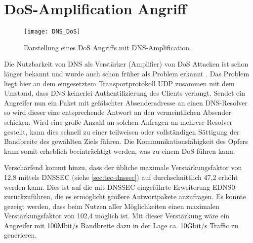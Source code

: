 \section{DoS-Amplification Angriff}
\label{sec:attack-dosamp}
\begin{wrapfigure}{r}{0.35\textwidth}
    \begin{center}
        \texttt{[image: DNS\_DoS]}
    \end{center}
    \caption{Darstellung eines DoS Angriffs mit DNS-Amplification.}
    \label{img:dnsdos}
\end{wrapfigure}

Die Nutzbarkeit von DNS als Verstärker (Amplifier) von \ac{DoS} Attacken ist schon länger bekannt und wurde auch schon früher als Problem erkannt \cite{ICANN2006}. Das Problem liegt hier an dem eingesetztem Transportprotokoll UDP zusammen mit dem Umstand, dass DNS keinerlei Authentifizierung des Clients verlangt. Sendet ein Angreifer nun ein Paket mit gefälschter Absenderadresse an einen DNS-Resolver so wird dieser eine entsprechende Antwort an den vermeintlichen Absender schicken. Wird eine große Anzahl an solchen Anfragen an mehrere Resolver gestellt, kann dies schnell zu einer teilweisen oder vollständigen Sättigung der Bandbreite des gewählten Ziels führen. Die Kommunikationsfähigkeit des Opfers kann somit erheblich beeinträchtigt werden, was zu einem \ac{DoS} führen kann. 

Verschärfend kommt hinzu, dass der übliche maximale Verstärkungsfaktor von 12,8 mittels \ac{DNSSEC} (siehe \ref{sec:tec-dnssec}) auf durchschnittlich 47,2 erhöht werden kann. Dies ist auf die mit \ac{DNSSEC} eingeführte Erweiterung EDNS0 zurückzuführen, die es ermöglicht größere Antwortpakete anzufragen. Es konnte gezeigt werden, dass beim Nutzen aller Möglichkeiten einen maximalen Verstärkungsfaktor von 102,4 möglich ist\cite{VanRijswijk-Deij2014}. Mit dieser Verstärkung wäre ein Angreifer mit 100Mbit/s Bandbreite dazu in der Lage ca. 10Gbit/s Traffic zu generieren.

